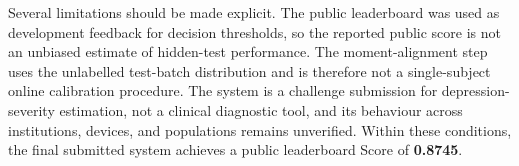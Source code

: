 \documentclass[sigconf,screen,review]{acmart}
\begin{document}
Several limitations should be made explicit. The public leaderboard was used as
development feedback for decision thresholds, so the reported public score is
not an unbiased estimate of hidden-test performance. The moment-alignment step
uses the unlabelled test-batch distribution and is therefore not a single-subject
online calibration procedure. The system is a challenge submission for
depression-severity estimation, not a clinical diagnostic tool, and its behaviour
across institutions, devices, and populations remains unverified. Within these
conditions, the final submitted system achieves a public leaderboard Score of
\textbf{0.8745}.



\end{document}
